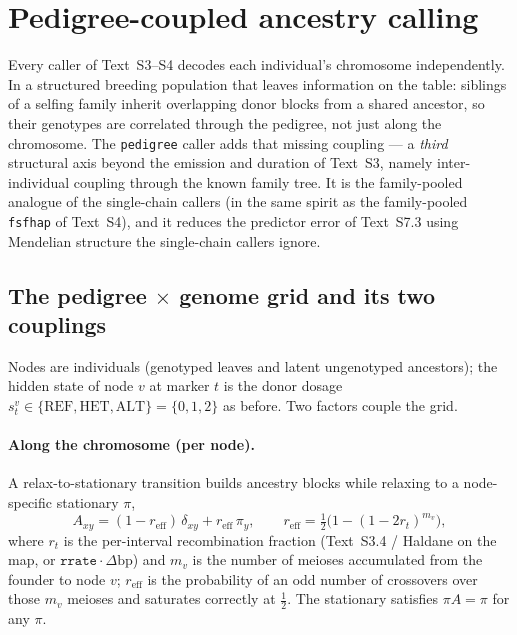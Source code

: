 \documentclass[11pt]{article}
\newcommand{\REF}{\mathrm{REF}}
\newcommand{\HET}{\mathrm{HET}}
\newcommand{\ALT}{\mathrm{ALT}}
\providecommand{\fsfhap}{\texttt{fsfhap}\xspace}
\providecommand{\pedigree}{\texttt{pedigree}\xspace}
\begin{document}
\section{Pedigree-coupled ancestry calling}
\label{sec:pedigree}

Every caller of Text~S3--S4 decodes each individual's chromosome independently. In
a structured breeding population that leaves information on the table: siblings of a
selfing family inherit overlapping donor blocks from a shared ancestor, so their
genotypes are correlated through the pedigree, not just along the chromosome. The
\pedigree caller adds that missing coupling --- a \emph{third} structural axis beyond
the emission and duration of Text~S3, namely inter-individual coupling through the
known family tree. It is the family-pooled analogue of the single-chain callers (in
the same spirit as the family-pooled \fsfhap of Text~S4), and it reduces the
predictor error of Text~S7.3 using Mendelian structure the single-chain callers
ignore.

\subsection{The pedigree $\times$ genome grid and its two couplings}
\label{sec:ped-grid}

Nodes are individuals (genotyped leaves and latent ungenotyped ancestors); the
hidden state of node $v$ at marker $t$ is the donor dosage
$s^v_t\in\{\REF,\HET,\ALT\}=\{0,1,2\}$ as before. Two factors couple the grid.

\paragraph{Along the chromosome (per node).} A relax-to-stationary transition
builds ancestry blocks while relaxing to a node-specific stationary $\pi$,
\begin{equation}
A_{xy} = (1-r_{\mathrm{eff}})\,\delta_{xy} + r_{\mathrm{eff}}\,\pi_y,
\qquad
r_{\mathrm{eff}} = \tfrac12\big(1-(1-2r_t)^{m_v}\big),
\label{eq:ped-transition}
\end{equation}
where $r_t$ is the per-interval recombination fraction (Text~S3.4 / Haldane on the
map, or $\texttt{rrate}\cdot\Delta\mathrm{bp}$) and $m_v$ is the number of meioses
accumulated from the founder to node $v$; $r_{\mathrm{eff}}$ is the probability of
an odd number of crossovers over those $m_v$ meioses and saturates correctly at
$\tfrac12$. The stationary satisfies $\pi A=\pi$ for any $\pi$.
\end{document}
